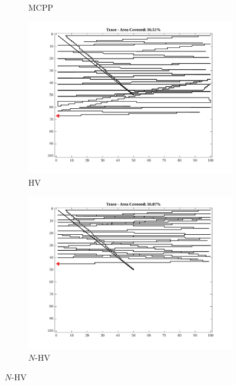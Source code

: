 \begin{figure}[htb!]
\begin{subfigure}[t]{0.25\textwidth}
        \captionsetup{skip=0.20\baselineskip,size=footnotesize}
        \caption{MCPP}
    \end{subfigure}%
    \begin{subfigure}[t]{0.25\textwidth}
        \centering
        \includegraphics[width=\linewidth]{figures/path_nhv_30p_100x100_sf_1_seed_1.png}
        \captionsetup{skip=0.20\baselineskip,size=footnotesize}
        \caption{HV}
    \end{subfigure}%
    \begin{subfigure}[t]{0.25\textwidth}
        \centering
        \includegraphics[width=\linewidth]{figures/path_nnhv_30p_100x100_sf_1_seed_1.png}
        \captionsetup{skip=0.20\baselineskip,size=footnotesize}
        \caption{$N$-HV}

\end{subfigure}
\end{figure}
